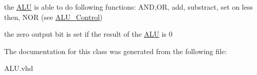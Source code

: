 the \hyperlink{class_a_l_u}{\-A\-L\-U} is able to do following functions\-: \-A\-N\-D,\-O\-R, add, substract, set on less then, \-N\-O\-R (see \hyperlink{class_a_l_u___control}{\-A\-L\-U\-\_\-\-Control})

the zero output bit is set if the result of the \hyperlink{class_a_l_u}{\-A\-L\-U} is 0 

\-The documentation for this class was generated from the following file\-:\begin{DoxyCompactItemize}
\item 
\-A\-L\-U.\-vhd\end{DoxyCompactItemize}
